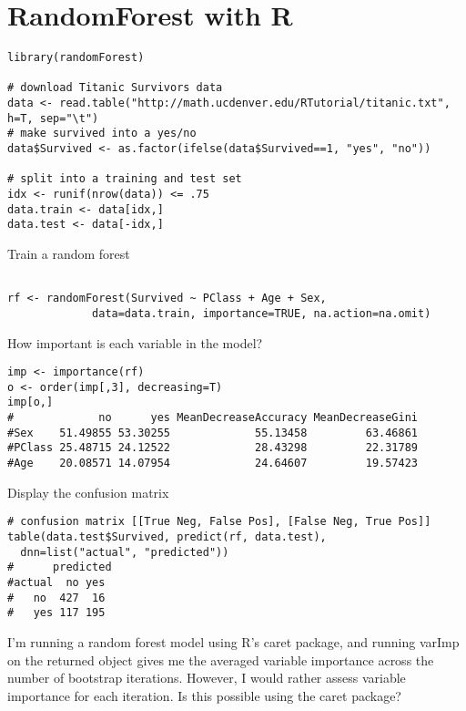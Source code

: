 \documentclass[caret-main.tex]{subfiles}
\begin{document}
\section{RandomForest with R}
\begin{framed}
\begin{verbatim}
library(randomForest)
 
# download Titanic Survivors data
data <- read.table("http://math.ucdenver.edu/RTutorial/titanic.txt", h=T, sep="\t")
# make survived into a yes/no
data$Survived <- as.factor(ifelse(data$Survived==1, "yes", "no"))                 
 
# split into a training and test set
idx <- runif(nrow(data)) <= .75
data.train <- data[idx,]
data.test <- data[-idx,]
\end{verbatim}
\end{framed} 
Train a random forest
\begin{framed}
\begin{verbatim} 

rf <- randomForest(Survived ~ PClass + Age + Sex, 
             data=data.train, importance=TRUE, na.action=na.omit)
\end{verbatim}
\end{framed} 
How important is each variable in the model?
\begin{framed}
\begin{verbatim}
imp <- importance(rf)
o <- order(imp[,3], decreasing=T)
imp[o,]
#             no      yes MeanDecreaseAccuracy MeanDecreaseGini
#Sex    51.49855 53.30255             55.13458         63.46861
#PClass 25.48715 24.12522             28.43298         22.31789
#Age    20.08571 14.07954             24.64607         19.57423
\end{verbatim}
\end{framed} 
Display the confusion matrix
\begin{framed}
\begin{verbatim} 
# confusion matrix [[True Neg, False Pos], [False Neg, True Pos]]
table(data.test$Survived, predict(rf, data.test),
  dnn=list("actual", "predicted"))
#      predicted
#actual  no yes
#   no  427  16
#   yes 117 195
\end{verbatim}
\end{framed}
\newpage
I'm running a random forest model using R's caret package, and running varImp on the returned object gives me the averaged variable importance across the number of bootstrap iterations. However, I would rather assess variable importance for each iteration. Is this possible using the caret package?
\end{document}
